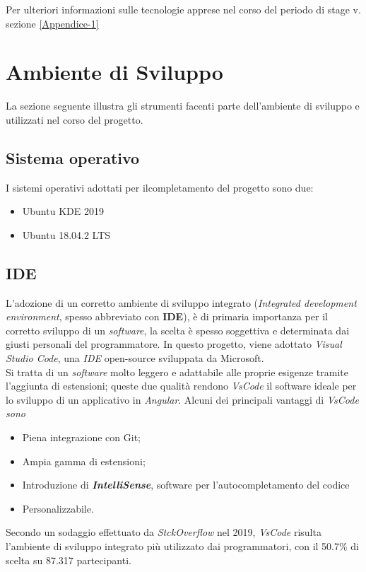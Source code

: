 \bigbreak
\noindent
Per ulteriori informazioni sulle tecnologie apprese nel corso del periodo di stage v. sezione \ref{Appendice-1}

\section{Ambiente di Sviluppo}
La sezione seguente illustra gli strumenti facenti parte dell'ambiente di sviluppo e utilizzati nel corso del progetto.

\subsection{Sistema operativo}
I sistemi operativi adottati per ilcompletamento del progetto sono due:
\begin{itemize}
	\item Ubuntu KDE 2019
	\item Ubuntu 18.04.2 LTS
\end{itemize}

\subsection{IDE}
L'adozione di un corretto ambiente di sviluppo integrato (\textit{Integrated development environment}, spesso abbreviato con \textbf{IDE}), è di primaria importanza per il corretto sviluppo di un \textit{software}, la scelta è spesso soggettiva e determinata dai giusti personali del programmatore.
In questo progetto, viene adottato \textit{Visual Studio Code}, una \textit{IDE} \gls{open-source} sviluppata da Microsoft.\\
Si tratta di un \textit{software} molto leggero e adattabile alle proprie esigenze tramite l'aggiunta di estensioni; queste due qualità rendono \textit{VsCode} il software ideale per lo sviluppo di un applicativo in \textit{Angular}.
Alcuni dei principali vantaggi di \textit{VsCode sono}
\begin{itemize}
	\item Piena integrazione con \gls{Git};
	\item Ampia gamma di estensioni;
	\item Introduzione di \textbf{\textit{IntelliSense}}, software per l'autocompletamento del codice
	\item Personalizzabile.
\end{itemize}
Secondo un sodaggio effettuato da \textit{StckOverflow} nel 2019, \textit{VsCode} risulta l'ambiente di sviluppo integrato più utilizzato dai programmatori, con il 50.7\% di scelta su 87.317 partecipanti.


